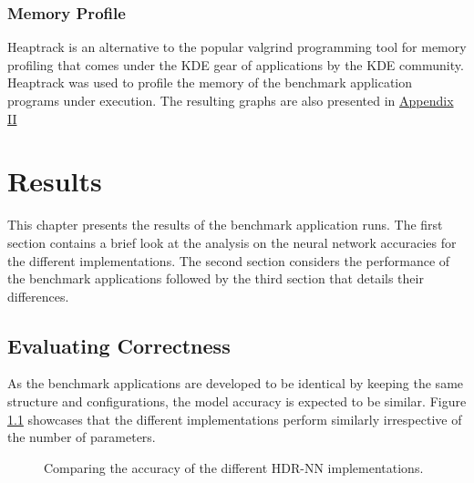 \subsection{Memory Profile}

Heaptrack is an alternative to the popular valgrind programming tool for memory profiling that comes under the KDE gear of applications by the KDE community. Heaptrack was used to profile the memory of the benchmark application programs under execution. The resulting graphs are also presented in \hyperref[hdrnn-memory-profile]{Appendix II}



\chapter{Results}

This chapter presents the results of the benchmark application runs. The first section contains a brief look at the analysis on the neural network accuracies for the different implementations. The second section considers the performance of the benchmark applications followed by the third section that details their differences.


\section{Evaluating Correctness}

As the benchmark applications are developed to be identical by keeping the same structure and configurations, the model accuracy is expected to be similar. Figure \ref{hdrnn-accuracy} showcases that the different implementations perform similarly irrespective of the number of parameters.


\begin{figure}[!ht]
	\centering
	
	\caption[HDR-NN Accuracy]{Comparing the accuracy of the different HDR-NN implementations.}
	\label{hdrnn-accuracy}
\end{figure}

